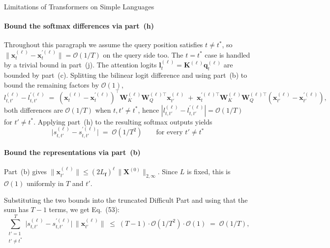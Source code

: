 \begin{question}{Limitations of Transformers on Simple Languages}
\begin{subquestion}
    \paragraph{Bound the softmax differences via part~(h)}
    Throughout this paragraph we assume the query position satisfies $t \ne t^*$, so $\|\mathbf{x}_t^{(\ell)} - \mathbf{x}_t^{\prime(\ell)}\| = \mathcal{O}(1/T)$ on the query side too.
    The $t = t^*$ case is handled by a trivial bound in part~(j).
    The attention logits $\mathbf{l}_t^{(\ell)} = \mathbf{K}^{(\ell)} \mathbf{q}_t^{(\ell)}$ are bounded by part~(c).
    Splitting the bilinear logit difference and using part~(b) to bound the remaining factors by $\mathcal{O}(1)$,
    \begin{equation*}
        l_{t,t'}^{(\ell)} - l_{t,t'}^{\prime(\ell)} \;=\; (\mathbf{x}_t^{(\ell)} - \mathbf{x}_t^{\prime(\ell)})^{\!\top}\mathbf{W}_K^{(\ell)}\mathbf{W}_Q^{(\ell)\top}\mathbf{x}_{t'}^{(\ell)} \;+\; \mathbf{x}_t^{\prime(\ell)\top}\mathbf{W}_K^{(\ell)}\mathbf{W}_Q^{(\ell)\top}(\mathbf{x}_{t'}^{(\ell)} - \mathbf{x}_{t'}^{\prime(\ell)}),
    \end{equation*}
    both differences are $\mathcal{O}(1/T)$ when $t, t' \ne t^*$, hence $|l_{t,t'}^{(\ell)} - l_{t,t'}^{\prime(\ell)}| = \mathcal{O}(1/T)$ for $t' \ne t^*$.
    Applying part~(h) to the resulting softmax outputs yields
    \begin{equation*}
        \bigl|s_{t,t'}^{(\ell)} - s_{t,t'}^{\prime(\ell)}\bigr| \;=\; \mathcal{O}(1/T^{2}) \qquad \text{for every } t' \ne t^*
    \end{equation*}

    \paragraph{Bound the representations via part~(b)}
    Part~(b) gives $\|\mathbf{x}_{t'}^{(\ell)}\| \le (2L_{\mathbf{f}})^{\ell}\,\|\mathbf{X}^{(0)}\|_{2,\infty}$. 
    Since $L$ is fixed, this is $\mathcal{O}(1)$ uniformly in $T$ and $t'$.

    Substituting the two bounds into the truncated Difficult Part and using that the sum has $T - 1$ terms, we get Eq.~(53):
    \begin{equation*}
        \sum_{\substack{t'=1 \\ t' \ne t^*}}^{T} \bigl|s_{t,t'}^{(\ell)} - s_{t,t'}^{\prime(\ell)}\bigr|\, \|\mathbf{x}_{t'}^{(\ell)}\|
        \;\le\; (T-1) \cdot \mathcal{O}(1/T^{2}) \cdot \mathcal{O}(1)
        \;=\; \mathcal{O}(1/T),
    \end{equation*}
\end{subquestion}


\end{question}
